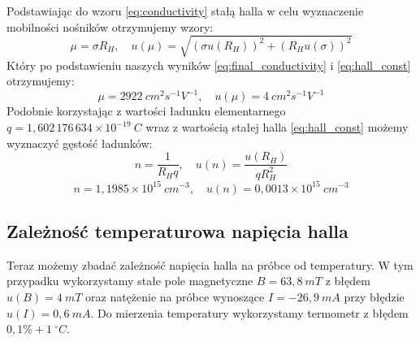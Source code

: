 \documentclass[12pt]{article}
\begin{document}
Podstawiając do wzoru \ref{eq:conductivity} stałą halla w celu wyznaczenie mobilności nośników otrzymujemy wzory:
\[
    \mu = \sigma R_H, \quad u(\mu) = \sqrt{(\sigma u(R_H))^2+(R_H u(\sigma))^2}
\]
Który po podstawieniu naszych wyników \ref{eq:final_conductivity} i \ref{eq:hall_const} otrzymujemy:
\begin{equation}
    \mu = 2922 \ cm^2s^{-1}V^{-1}, \quad u(\mu) = 4 \ cm^2s^{-1}V^{-1}
    \label{eq:mobility}
\end{equation}
Podobnie korzystając z wartości ładunku elementarnego \cite{charge} $q=1{,}602\,176\,634 \times 10^{-19} \ C$ wraz z wartością stałej halla \ref{eq:hall_const} możemy wyznaczyć gęstość ładunków:
\[
    n = \frac{1}{R_H q}, \quad u(n) = \frac{u(R_H)}{q R_H^2}
\]
\begin{equation}
    n = 1{,}1985\times 10^{15} \ cm^{-3}, \quad u(n) = 0{,}0013\times 10^{15} \ cm^{-3}
    \label{eq:density}
\end{equation}

\subsection{Zależność temperaturowa napięcia halla}
Teraz możemy zbadać zależność napięcia halla na próbce od temperatury. W tym przypadku wykorzystamy stałe pole magnetyczne $B = 63{,}8 \ mT$ z błędem $u(B) = 4 \ mT$ oraz natężenie na próbce wynoszące $I = -26{,}9 \ mA$ przy błędzie $u(I) = 0{,}6 \ mA$.
Do mierzenia temperatury wykorzystamy termometr z błędem $0{,}1 \% + 1 \ ^{\circ}C$.
\end{document}

